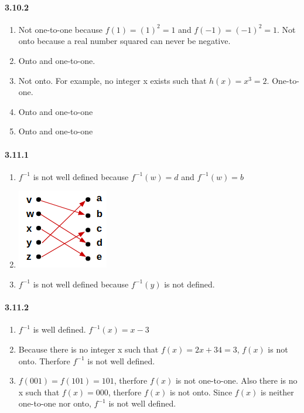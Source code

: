 \documentclass[11pt, letterpaper, twocolumn, fleqn]{article}
\begin{document}
    \paragraph{3.10.2}
    \renewcommand{\labelenumi}{\alph{enumi}.}
    \begin{enumerate}
        \item Not one-to-one because $f(1)=(1)^2=1$ and $f(-1)=(-1)^2=1$. \newline
        Not onto because a real number squared can never be negative.
        \item Onto and one-to-one.
        \item Not onto. For example, no integer x exists such that $h(x)=x^3=2$. One-to-one.
        \addtocounter{enumi}{2}
        \item Onto and one-to-one
        \addtocounter{enumi}{3}
        \item Onto and one-to-one
    \end{enumerate}
    
    \paragraph{3.11.1}
    \renewcommand{\labelenumi}{\alph{enumi}.}
    \begin{enumerate}
        \item $f^{-1}$ is not well defined because $f^{-1}(w) = d$ and $f^{-1}(w) = b$
        \item \includegraphics{3_11_1b}
        \item $f^{-1}$ is not well defined because $f^{-1}(y)$ is not defined.
    \end{enumerate}
    
    \paragraph{3.11.2}
    \renewcommand{\labelenumi}{\alph{enumi}.}
    \begin{enumerate}
        \item $f^{-1}$ is well defined. $f^{-1}(x)=x-3$
        \item Because there is no integer x such that $f(x)=2x+34=3$, $f(x)$ is not onto. Therfore $f^{-1}$ is not well defined.
        \addtocounter{enumi}{3}
        \item $f(001)=f(101)=101$, therfore $f(x)$ is not one-to-one. Also there is no x such that $f(x)=000$, therfore $f(x)$ is not onto. Since $f(x)$ is neither one-to-one nor onto, $f^{-1}$ is not well defined.
    \end{enumerate}
    
\end{document}
